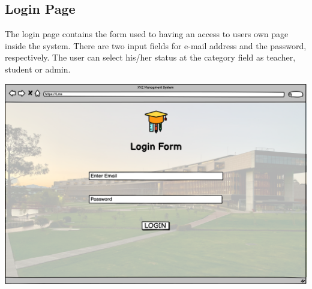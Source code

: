 \subsection{Login Page}
  
The login page contains the form used to having an access to users own page inside the system. There are two input fields for e-mail address and the password, respectively. The user can select his/her status at the category field as teacher, student or admin.

\includegraphics[width=\columnwidth]{images/LoginForm.png}